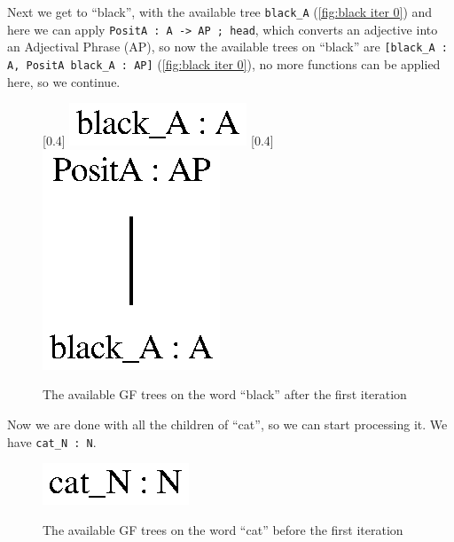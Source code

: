 Next we get to ``black'', with the available tree \lstinline|black_A| (\autoref{fig:black iter 0}) and here we can apply \lstinline|PositA : A -> AP ; head|, which converts an adjective into an Adjectival Phrase (AP), so now the available trees on ``black'' are
\lstinline|[black_A : A, PositA black_A : AP]| (\autoref{fig:black iter 0}), no more functions can be applied here, so we continue.

\begin{figure}[H]
    \centering
    [0.4\textwidth]
        {\includegraphics[scale=0.75]{thesis/figure/black_cats/black_A_gf.eps}}
    [0.4\textwidth]
        {\includegraphics[scale=0.75]{thesis/figure/black_cats/black_AP_gf.eps}}
    \caption{The available GF trees on the word ``black'' after the first iteration}\label{fig:black iter 1}
\end{figure}


Now we are done with all the children of ``cat'', so we can start processing it. We have \lstinline|cat_N : N|. 

\begin{figure}[H]
    \centering
        {\includegraphics[scale=0.75]{thesis/figure/black_cats/cat_N_gf.eps}}
    \caption{The available GF trees on the word ``cat'' before the first iteration}\label{fig:cat iter 0}
\end{figure}

